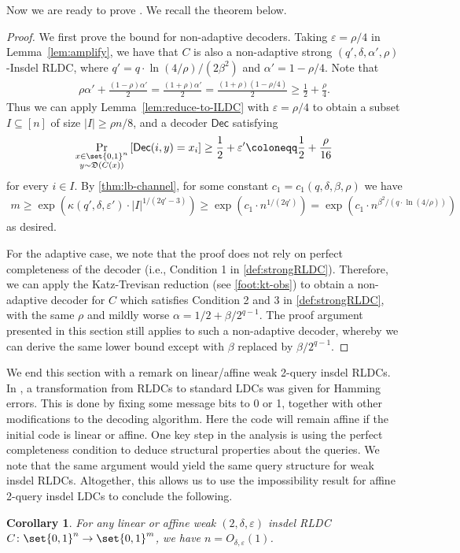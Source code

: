 \documentclass[10pt,a4paper]{article}
\newtheorem{corollary}{Corollary}
\theoremstyle{remark}
\newcommand{\tuple}[1]{\ensuremath{\left(#1\right)}}
\newcommand{\tp}{\tuple}
\newcommand{\eps}{\ensuremath{\varepsilon}}
\newcommand{\Dec}{\ensuremath{\mathsf{Dec}}\xspace}
\begin{document}
Now we are ready to prove . We recall the theorem below.
\strirldcmain*
\begin{proof}
We first prove the bound for non-adaptive decoders. Taking $\eps = \rho/4$ in Lemma~\ref{lem:amplify}, we have that $C$ is also a non-adaptive strong $(q',\delta,\alpha', \rho)$-Insdel RLDC, where $q'=q\cdot \ln(4/\rho)/(2\beta^2)$ and $\alpha'=1-\rho/4$. Note that
\begin{align*}
	\rho\alpha' + \frac{(1-\rho)\alpha'}{2} = \frac{(1+\rho)\alpha'}{2} = \frac{(1+\rho)(1-\rho/4)}{2} \ge \frac{1}{2} + \frac{\rho}{4}.
\end{align*}
Thus we can apply Lemma~\ref{lem:reduce-to-ILDC} with $\eps = \rho/4$ to obtain a subset $I\subseteq [n]$ of size $|I| \ge \rho n/8$, and a decoder $\Dec$ satisfying
\begin{align*}
	\Pr_{\substack{x \in \set{0,1}^n \\ y \sim \mathfrak{D}(C(x))}}\left[ \Dec(i, y) = x_i \right] \ge \frac{1}{2} + \eps' \coloneqq \frac{1}{2}+\frac{\rho}{16} 
\end{align*}
for every $i \in I$. By \cref{thm:lb-channel}, for some constant $c_1=c_1(q,\delta,\beta,\rho)$ we have 
\begin{align*}
m \ge \exp\tp{\kappa(q',\delta,\eps') \cdot |I|^{1/(2q'-3)}} \ge \exp\tp{c_1 \cdot n^{1/(2q')}} = \exp\tp{c_1\cdot n^{\beta^2/(q \cdot \ln(4/\rho))}}
\end{align*}
as desired. 

For the adaptive case, we note that the proof does not rely on perfect completeness of the decoder (i.e., Condition 1 in \cref{def:strongRLDC}). Therefore, we can apply the Katz-Trevisan reduction (see \cref{foot:kt-obs}) to obtain a non-adaptive decoder for $C$ which satisfies Condition 2 and 3 in \cref{def:strongRLDC}, with the same $\rho$ and mildly worse $\alpha=1/2+\beta/2^{q-1}$. The proof argument presented in this section still applies to such a non-adaptive decoder, whereby we can derive the same lower bound except with $\beta$ replaced by $\beta/2^{q-1}$.
\end{proof}

We end this section with a remark on linear/affine weak 2-query insdel RLDCs. In , a transformation from RLDCs to standard LDCs was given for Hamming errors. This is done by fixing some message bits to 0 or 1, together with other modifications to the decoding algorithm. Here the code will remain affine if the initial code is linear or affine. One key step in the analysis is using the perfect completeness condition to deduce structural properties about the queries. We note that the same argument would yield the same query structure for weak insdel RLDCs. Altogether, this allows us to use the impossibility result for affine 2-query insdel LDCs \cite{blocki2021exponential} to conclude the following.
\begin{corollary} \label{cor:linear-2qIRLDC}
For any linear or affine weak $(2,\delta,\eps)$ insdel RLDC $C \colon \set{0,1}^n \rightarrow \set{0,1}^m$, we have $n=O_{\delta,\eps}(1)$.
\end{corollary}
\end{document}
